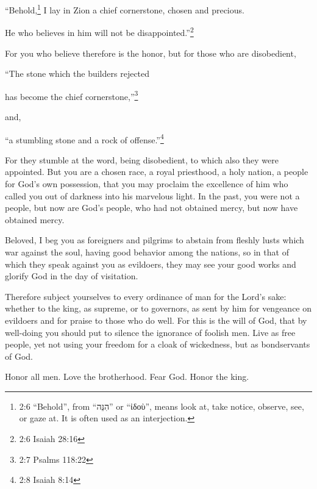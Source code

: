 “Behold,\footnote{2:6 “Behold”, from “הִנֵּה” or “ἰδοὺ”, means look at, take notice, observe, see, or gaze 	at. It is often used as an interjection.} I lay in Zion a chief cornerstone, chosen and precious.

He who believes in him will not be disappointed.”\footnote{2:6 Isaiah 28:16}


\myverse{}For you who believe therefore is the honor, but for those who are
disobedient,

“The stone which the builders rejected

has become the chief cornerstone,”\footnote{2:7 Psalms 118:22}


\myverse{}and,

“a stumbling stone and a rock of offense.”\footnote{2:8 Isaiah 8:14}

For they stumble at the word, being disobedient, to which also they were appointed. \myverse{}But you are a chosen race, a royal priesthood, a holy nation, a people for God’s own possession, that you may proclaim the excellence of him who called you out of darkness into his marvelous light. \myverse{}In the past, you were not a people, but now are God’s people, who had not obtained mercy, but now have obtained mercy.


\myverse{}Beloved, I beg you as foreigners and pilgrims to abstain from
fleshly lusts which war against the soul, \myverse{}having good behavior among the nations, so in that of which they speak against you as evildoers, they may see your good works and glorify God in the day of visitation.


\myverse{}Therefore subject yourselves to every ordinance of man for the Lord’s sake: whether to the king, as supreme, \myverse{}or to governors, as sent by him for vengeance on evildoers and for praise to those who do well. \myverse{}For this is the will of God, that by well-doing you should put to silence the ignorance of foolish men. \myverse{}Live as free people, yet not using your freedom for a cloak of wickedness, but as bondservants of God.


\myverse{}Honor all men. Love the brotherhood. Fear God. Honor the king.


